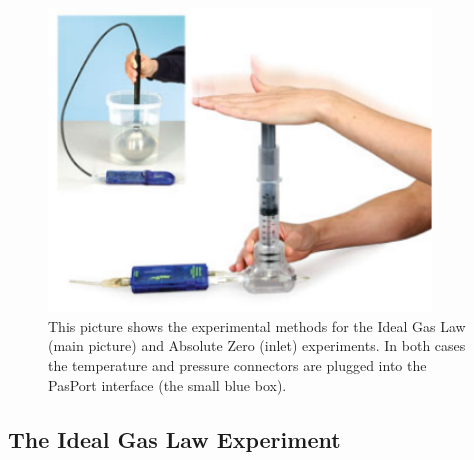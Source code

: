 \begin{figure}
  \begin{center}
    \includegraphics[width=4.0in]{Experiment10Figures/Figure02.pdf}
  \end{center}
  \caption{This picture shows the experimental methods for the Ideal Gas Law (main picture) and Absolute Zero (inlet) experiments. In both cases the temperature and pressure connectors are plugged into the PasPort interface (the small blue box).}
  \label{H01Fig02}
\end{figure}

\subsection{The Ideal Gas Law Experiment}

